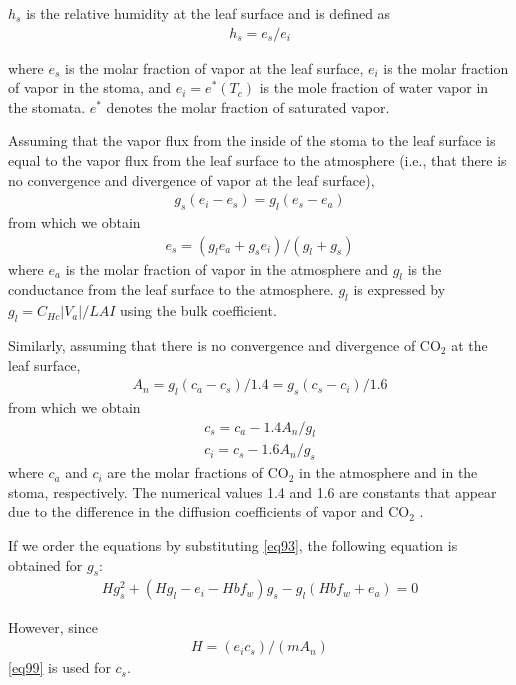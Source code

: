 \(h_s\) is the relative humidity at the leaf surface and is defined as \begin{eqnarray}
 h_s = e_s / e_i \label{eq94}
\end{eqnarray}

where \(e_s\) is the molar fraction of vapor at the leaf surface, \(e_i\) is the molar fraction of vapor in the stoma, and \(e_i = e^* (T_c)\) is the mole fraction of water vapor in the stomata.
\(e^*\) denotes the molar fraction of saturated vapor.

Assuming that the vapor flux from the inside of the stoma to the leaf surface is equal to the vapor flux from the leaf surface to the atmosphere (i.e., that there is no convergence and divergence of
vapor at the leaf surface), \begin{eqnarray}
 g_s(e_i - e_s) = g_l(e_s - e_a) \label{eq95}
\end{eqnarray} from which we obtain \begin{eqnarray}
 e_s = ( g_l e_a + g_s e_i ) / ( g_l + g_s )\label{eq96}
\end{eqnarray} where \(e_a\) is the molar fraction of vapor in the atmosphere and \(g_l\) is the conductance from the leaf surface to the atmosphere. \(g_l\) is expressed by \(g_l = C_{Hc}|V_a| / LAI\) using the
bulk coefficient.

Similarly, assuming that there is no convergence and divergence of \(\mathrm{CO_2}\) at the leaf surface, \begin{eqnarray}
 A_n = g_l(c_a - c_s)/1.4
     = g_s(c_s - c_i)/1.6
\end{eqnarray} from which we obtain \begin{eqnarray}
 c_s = c_a - 1.4 A_n/g_l \\
 c_i = c_s - 1.6 A_n/g_s \label{eq99}
\end{eqnarray} where \(c_a\) and \(c_i\) are the molar fractions of \(\mathrm{CO_2}\) in the atmosphere and in the stoma, respectively. The numerical values 1.4 and 1.6 are constants that appear due to the
difference in the diffusion coefficients of vapor and \(\mathrm{CO_2}\) .

If we order the equations by substituting \ref{eq93}, the following equation is obtained for \(g_s\): \begin{eqnarray}
 H g_s^2 + ( H g_l - e_i - H b f_w ) g_s - g_l ( H b f_w + e_a ) = 0 \label{eq100}
\end{eqnarray}

However, since \begin{eqnarray}
 H = (e_i c_s)/(m A_n)
\end{eqnarray} \ref{eq99} is used for \(c_s\).

